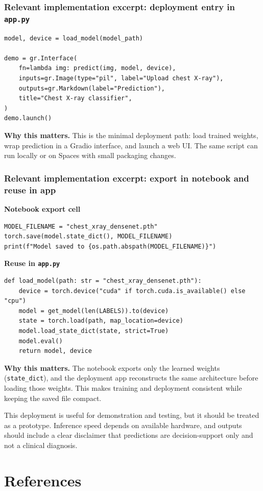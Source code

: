 \documentclass[12pt]{article}
\begin{document}
\subsubsection*{Relevant implementation excerpt: deployment entry in \texttt{app.py}}
\begin{verbatim}
model, device = load_model(model_path)

demo = gr.Interface(
    fn=lambda img: predict(img, model, device),
    inputs=gr.Image(type="pil", label="Upload chest X-ray"),
    outputs=gr.Markdown(label="Prediction"),
    title="Chest X-ray classifier",
)
demo.launch()
\end{verbatim}
\textbf{Why this matters.} This is the minimal deployment path: load trained weights, wrap prediction in a Gradio interface, and launch a web UI. The same script can run locally or on Spaces with small packaging changes.

\subsubsection*{Relevant implementation excerpt: export in notebook and reuse in app}
\textbf{Notebook export cell}
\begin{verbatim}
MODEL_FILENAME = "chest_xray_densenet.pth"
torch.save(model.state_dict(), MODEL_FILENAME)
print(f"Model saved to {os.path.abspath(MODEL_FILENAME)}")
\end{verbatim}

\textbf{Reuse in \texttt{app.py}}
\begin{verbatim}
def load_model(path: str = "chest_xray_densenet.pth"):
    device = torch.device("cuda" if torch.cuda.is_available() else "cpu")
    model = get_model(len(LABELS)).to(device)
    state = torch.load(path, map_location=device)
    model.load_state_dict(state, strict=True)
    model.eval()
    return model, device
\end{verbatim}
\textbf{Why this matters.} The notebook exports only the learned weights (\texttt{state\_dict}), and the deployment app reconstructs the same architecture before loading those weights. This makes training and deployment consistent while keeping the saved file compact.

This deployment is useful for demonstration and testing, but it should be treated as a prototype. Inference speed depends on available hardware, and outputs should include a clear disclaimer that predictions are decision-support only and not a clinical diagnosis.

\section*{References}


\end{document}
